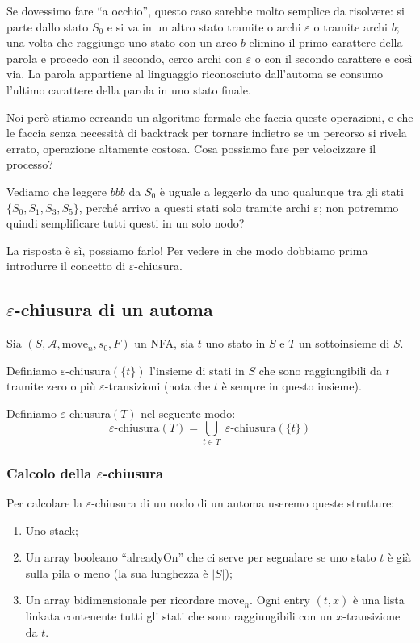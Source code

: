 \documentclass[class=book, crop=false, oneside, 12pt]{standalone}
\begin{document}
Se dovessimo fare “a occhio”, questo caso sarebbe molto semplice da risolvere: si parte dallo stato \(S_0\) e si va in un altro stato tramite o archi \(\varepsilon\) o tramite archi \(b\); una volta che raggiungo uno stato con un arco \(b\) elimino il primo carattere della parola e procedo con il secondo, cerco archi con \(\varepsilon\) o con il secondo carattere e così via.
La parola appartiene al linguaggio riconosciuto dall’automa se consumo l’ultimo carattere della parola in uno stato finale.

Noi però stiamo cercando un algoritmo formale che faccia queste operazioni, e che le faccia senza necessità di backtrack per tornare indietro se un percorso si rivela errato, operazione altamente costosa.
Cosa possiamo fare per velocizzare il processo?

Vediamo che leggere \(bbb\) da \(S_0\) è uguale a leggerlo da uno qualunque tra gli stati \(\{S_0, S_1, S_3, S_5\}\), perché arrivo a questi stati solo tramite archi \(\varepsilon\); non potremmo quindi semplificare tutti questi in un solo nodo?

La risposta è sì, possiamo farlo! Per vedere in che modo dobbiamo prima introdurre il concetto di \(\varepsilon\)-chiusura.


\subsection{\(\varepsilon\)-chiusura di un automa}
Sia \((S, \mathcal{A}, \textrm{move}_n, s_0, F)\) un NFA, sia \(t\) uno stato in \(S\) e \(T\) un sottoinsieme di \(S\).

Definiamo \(\varepsilon\)-chiusura\((\{t\})\) l’insieme di stati in \(S\) che sono raggiungibili da \(t\) tramite zero o più \(\varepsilon\)-transizioni (nota che \(t\) è sempre in questo insieme).

Definiamo \(\varepsilon\)-chiusura\((T)\) nel seguente modo:
\begin{equation}
    \varepsilon \textrm{-chiusura}(T) = \bigcup_{t \in T} \;\varepsilon\textrm{-chiusura}(\{t\})
\end{equation} 

\subsubsection{Calcolo della \(\varepsilon\)-chiusura}
Per calcolare la \(\varepsilon\)-chiusura di un nodo di un automa useremo queste strutture:

\begin{enumerate}
    \item Uno stack;
    \item Un array booleano “alreadyOn” che ci serve per segnalare se uno stato \(t\) è già sulla pila o meno (la sua lunghezza è \(|S|\));
    \item Un array bidimensionale per ricordare \(\textrm{move}_n\). Ogni entry \((t,x)\) è una lista linkata contenente tutti gli stati che sono raggiungibili con un \(x\)-transizione da \(t\).
\end{enumerate}
\end{document}
